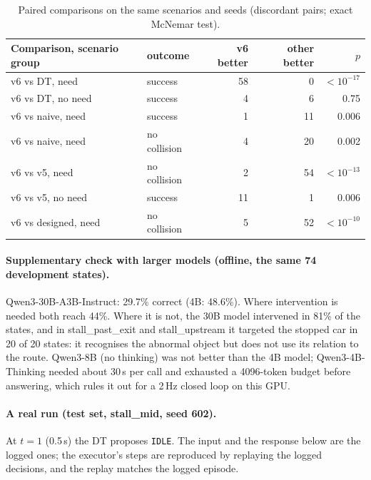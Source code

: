 \documentclass[11pt]{article}
\newenvironment{revblock}{\color{red}}{}
\begin{document}
\begin{revblock}
\begin{table}[h]
\centering\footnotesize
\caption{Paired comparisons on the same scenarios and seeds (discordant pairs; exact McNemar test).}
\label{tab:paired}
\begin{tabular}{llrrr}
\toprule
Comparison, scenario group & outcome & v6 better & other better & $p$ \\
\midrule
v6 vs DT, need & success & 58 & 0 & $<10^{-17}$ \\
v6 vs DT, no need & success & 4 & 6 & 0.75 \\
v6 vs naive, need & success & 1 & 11 & 0.006 \\
v6 vs naive, need & no collision & 4 & 20 & 0.002 \\
v6 vs v5, need & no collision & 2 & 54 & $<10^{-13}$ \\
v6 vs v5, no need & success & 11 & 1 & 0.006 \\
v6 vs designed, need & no collision & 5 & 52 & $<10^{-10}$ \\
\bottomrule
\end{tabular}
\end{table}

\paragraph{Supplementary check with larger models (offline, the same 74 development states).} Qwen3-30B-A3B-Instruct:
29.7\% correct (4B: 48.6\%). Where intervention is needed both reach 44\%. Where it is not, the 30B model intervened in
81\% of the states, and in stall\_past\_exit and stall\_upstream it targeted the stopped car in 20 of 20 states: it
recognises the abnormal object but does not use its relation to the route. Qwen3-8B (no thinking) was not better than
the 4B model; Qwen3-4B-Thinking needed about 30\,s per call and exhausted a 4096-token budget before answering, which
rules it out for a 2\,Hz closed loop on this GPU.

\paragraph{A real run (test set, stall\_mid, seed 602).} At $t=1$ (0.5\,s) the DT proposes \texttt{IDLE}. The input
and the response below are the logged ones; the executor's steps are reproduced by replaying the logged decisions,
and the replay matches the logged episode.
\end{revblock}
\end{document}
